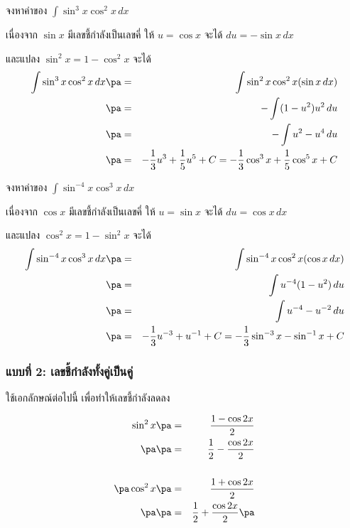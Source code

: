 \begin{frame}[t]
\begin{ex}
จงหาค่าของ $ \int \sin^3 x \cos^2 x \, dx$ \pa
\end{ex}

\begin{sol}
เนื่องจาก $\sin x$ มีเลขชี้กำลังเป็นเลขคี่ ให้ $u = \cos x$ จะได้ \pa $du = -\sin x\, dx$  \pa

และแปลง $\sin^2 x = 1- \cos^2 x$ จะได้ \pa
\begin{eqnarray*}
\int \sin^3 x \cos^2 x \, dx \pa &=& \int\sin^2 x \cos^2 x (\sin x\, dx) \\ 
\pa &=& -\int (1-u^2) u^2\, du \\
\pa &=& -\int u^2 - u^4 \, du \\
\pa &=& -\frac{1}{3} u^3 + \frac{1}{5} u^5 + C = -\frac{1}{3} \cos^3 x + \frac{1}{5} \cos^5 x + C
\end{eqnarray*}
\end{sol}
\end{frame}


\begin{frame}[t]
\begin{ex}
จงหาค่าของ $ \int \sin^{-4} x \cos^3 x \, dx$ \pa
\end{ex}

\begin{sol}
เนื่องจาก $\cos x$ มีเลขชี้กำลังเป็นเลขคี่ ให้ $u = \sin x$ จะได้ \pa $du = \cos x\, dx$ \pa

และแปลง $\cos^2 x = 1- \sin^2 x$ จะได้ \pa
\begin{eqnarray*}
\int \sin^{-4} x \cos^3 x \, dx \pa &=& \int\sin^{-4} x \cos^2 x (\cos x\, dx) \\
\pa &=& \int u^{-4} (1-u^2) \, du \\
\pa &=& \int u^{-4} - u^{-2} \, du \\
\pa &=& -\frac{1}{3} u^{-3} + u^{-1} + C = -\frac{1}{3} \sin^{-3} x - \sin^{-1} x + C
\end{eqnarray*}
\end{sol}
\end{frame}

\begin{frame}[t]
\frametitle{แบบที่ 2: เลขชี้กำลังทั้งคู่เป็นคู่}

ใช้เอกลักษณ์ต่อไปนี้ เพื่อทำให้เลขชี้กำลังลดลง
\begin{slide}
\begin{eqnarray*}
\sin^2 x \pa &=& \frac{1-\cos 2x}{2} \\ \pa
\pa &=& \frac{1}{2} - \frac{\cos 2x}{2} \\ 
&\quad& \\ \pa
\cos^2 x \pa &=& \frac{1+\cos 2x}{2} \\ \pa
\pa &=& \frac{1}{2} + \frac{\cos 2x}{2} \pa
\end{eqnarray*}
\end{slide}
\end{frame}


